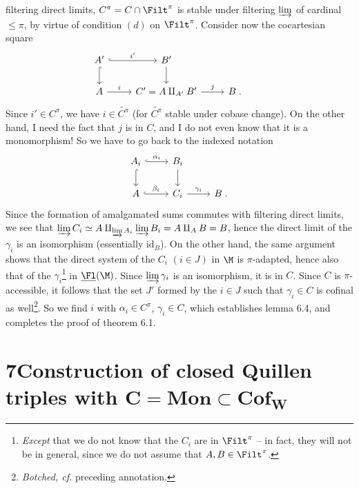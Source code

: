 filtering direct limits, $C^{\pi} = C \cap \Filt^{\pi}$ is stable under filtering $\varinjlim$ of cardinal $\leq \pi$, by virtue of condition $(d)$ on $\Filt^{\pi}$. Consider now the cocartesian square
\[
\begin{tikzcd}
A' \arrow[r, hook, "i'"] \arrow[d, hook] & B' \arrow[d] & & \\
A \arrow[r, "i"] & C' = A \amalg_{A'} B' \arrow[r, "j"] & B \;.
\end{tikzcd}
\]
Since $i' \in C^{\pi}$, we have $i \in \widetilde{C^{\pi}}$ (for $\widetilde{C^{\pi}}$ stable under cobase change). On the other hand, I need the fact that $j$ is in $C$, and I do not even know that it is a monomorphism! So we have to go back to the indexed notation
\[
\begin{tikzcd}
A_i \arrow[r, hook, "\alpha_i"] \arrow[d, hook] & B_i \arrow[d] & \\
A \arrow[r, hook, "\beta_i"] & C_i \arrow[r, "\gamma_i"] & B \;.
\end{tikzcd}
\]
Since the formation of amalgamated sums commutes with filtering direct limits, we see that $\varinjlim C_i \simeq A \amalg_{\varinjlim A_i} \varinjlim B_i = A \amalg_A B = B$, hence the direct limit of the $\gamma_i$ is an isomorphism (essentially $\mathrm{id}_B$). On the other hand, the same argument shows that the direct system of the $C_i$ $(i \in J)$ in $\M$ is $\pi$-adapted, hence also that of the $\gamma_i$\footnote[28]{\textit{Except} that we do not know that the $C_i$ are in $\Filt^{\pi}$ -- in fact, they will not be in general, since we do not assume that $A, B \in \Filt^{\pi}$.}
in $\underline{\Fl}(\M)$. Since $\varinjlim \gamma_i$ is an isomorphism, it is in $C$. Since $C$ is $\pi$-accessible, it follows that the set $J'$ formed by the $i \in J$ such that $\gamma_i \in C$ is cofinal as well\footnote[29]{\textit{Botched, cf.} preceding annotation.}. So we find $i$ with $\alpha_i \in C^{\pi}$, $\gamma_i \in C$, which establishes lemma 6.4, and completes the proof of theorem 6.1.

\section*{7\quad Construction of closed Quillen triples with $\boldsymbol{C} = \mathbf{Mon} \subset \mathbf{Cof}_{\boldsymbol{W}}$}

